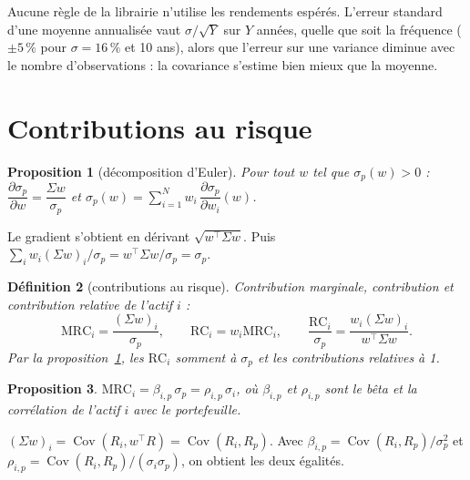 \documentclass[11pt,a4paper]{article}
\makeatletter
\theoremstyle{pdef}
\newtheorem{definition}{Définition}[section]
\theoremstyle{pstate}
\newtheorem{proposition}[definition]{Proposition}
\renewenvironment{proof}[1][\proofname]{\par\pushQED{\qed}\normalfont
  \topsep6pt\trivlist\item[\hskip\labelsep{\sffamily\bfseries #1.}]\ignorespaces}
  {\popQED\endtrivlist\@endpefalse}
\newcommand{\T}{^{\top}}
\newcommand{\pct}{\,\%}
\DeclareMathOperator{\Cov}{Cov}
\newcommand{\RC}{\mathrm{RC}}
\newcommand{\MRC}{\mathrm{MRC}}
\makeatother
\begin{document}
\begin{pratique}
Aucune règle de la librairie n'utilise les rendements espérés. L'erreur standard d'une
moyenne annualisée vaut $\sigma/\sqrt Y$ sur $Y$ années, quelle que soit la fréquence
($\pm5\pct$ pour $\sigma=16\pct$ et 10 ans), alors que l'erreur sur une variance diminue
avec le nombre d'observations : la covariance s'estime bien mieux que la moyenne.
\end{pratique}

\section{Contributions au risque}\label{sec:rc}

\begin{proposition}[décomposition d'Euler]\label{prop:euler}
Pour tout $w$ tel que $\sigma_p(w)>0$ :
$\dfrac{\partial\sigma_p}{\partial w}=\dfrac{\Sigma w}{\sigma_p}$ et
$\sigma_p(w)=\sum_{i=1}^Nw_i\,\dfrac{\partial\sigma_p}{\partial w_i}(w)$.
\end{proposition}

\begin{proof}
Le gradient s'obtient en dérivant $\sqrt{w\T\Sigma w}$. Puis
$\sum_iw_i(\Sigma w)_i/\sigma_p=w\T\Sigma w/\sigma_p=\sigma_p$.
\end{proof}

\begin{definition}[contributions au risque]
Contribution marginale, contribution et contribution relative de l'actif $i$ :
\[
\MRC_i=\frac{(\Sigma w)_i}{\sigma_p},\qquad\RC_i=w_i\MRC_i,\qquad
\frac{\RC_i}{\sigma_p}=\frac{w_i(\Sigma w)_i}{w\T\Sigma w}.
\]
Par la proposition~\ref{prop:euler}, les $\RC_i$ somment à $\sigma_p$ et les
contributions relatives à 1.
\end{definition}

\begin{proposition}\label{prop:beta}
$\MRC_i=\beta_{i,p}\,\sigma_p=\rho_{i,p}\,\sigma_i$, où $\beta_{i,p}$ et $\rho_{i,p}$ sont
le bêta et la corrélation de l'actif $i$ avec le portefeuille.
\end{proposition}

\begin{proof}
$(\Sigma w)_i=\Cov(R_i,w\T R)=\Cov(R_i,R_p)$. Avec
$\beta_{i,p}=\Cov(R_i,R_p)/\sigma_p^2$ et $\rho_{i,p}=\Cov(R_i,R_p)/(\sigma_i\sigma_p)$, on
obtient les deux égalités.
\end{proof}
\end{document}
